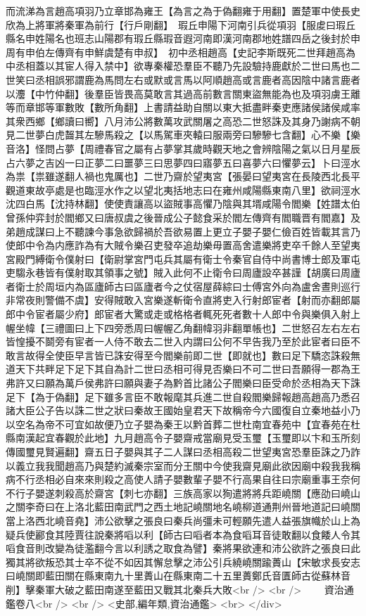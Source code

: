 而流涕為言趙高項羽乃立章邯為雍王【為言之為于偽翻雍于用翻】置楚軍中使長史欣為上將軍將秦軍為前行【行戶剛翻】　瑕丘申陽下河南引兵從項羽【服䖍曰瑕丘縣名申姓陽名也班志山陽郡有瑕丘縣瑕音遐河南即漢河南郡地姓譜四岳之後封於申周有申伯左傳齊有申鮮虞楚有申叔】　初中丞相趙高【史記李斯既死二世拜趙高為中丞相蓋以其宦人得入禁中】欲專秦權恐羣臣不聽乃先設驗持鹿獻於二世曰馬也二世笑曰丞相誤邪謂鹿為馬問左右或默或言馬以阿順趙高或言鹿者高因陰中諸言鹿者以灋【中竹仲翻】後羣臣皆畏高莫敢言其過高前數言關東盜無能為也及項羽虜王離等而章邯等軍數敗【數所角翻】上書請益助自關以東大抵盡畔秦吏應諸侯諸侯咸率其衆西鄉【鄉讀曰嚮】八月沛公將數萬攻武關屠之高恐二世怒誅及其身乃謝病不朝見二世夢白虎齧其左驂馬殺之【以馬駕車夾轅曰服兩旁曰驂驂七含翻】心不樂【樂音洛】怪問占夢【周禮春官之屬有占夢掌其歲時觀天地之會辨陰陽之氣以日月星辰占六夢之吉凶一曰正夢二曰噩夢三曰思夢四曰寤夢五曰喜夢六曰懼夢云】卜曰涇水為祟【祟雖遂翻人禍也鬼厲也】二世乃齋於望夷宮【張晏曰望夷宮在長陵西北長平觀道東故亭處是也臨涇水作之以望北夷括地志曰在雍州咸陽縣東南八里】欲祠涇水沈四白馬【沈持林翻】使使責讓高以盜賊事高懼乃陰與其壻咸陽令閻樂【姓譜太伯曾孫仲弈封於閻鄉又曰唐叔虞之後晉成公子懿食采於閻左傳齊有閻職晋有閻嘉】及弟趙成謀曰上不聽諫今事急欲歸禍於吾欲易置上更立子嬰子嬰仁儉百姓皆載其言乃使郎中令為内應詐為有大賊令樂召吏發卒追劫樂毋置高舍遣樂將吏卒千餘人至望夷宮殿門縛衛令僕射曰【衛尉掌宮門屯兵其屬有衛士令秦官自侍中尚書博士郎及軍屯吏騶永巷皆有僕射取其領事之號】賊入此何不止衛令曰周廬設卒甚謹【胡廣曰周廬者衛士於周垣内為區廬師古曰區廬者今之仗宿屋薛綜曰士傅宮外向為盧舍晝則巡行非常夜則警備不虞】安得賊敢入宮樂遂斬衛令直將吏入行射郎宦者【射而亦翻郎屬郎中令宦者屬少府】郎宦者大驚或走或格格者輒死死者數十人郎中令與樂俱入射上幄坐幃【三禮圖曰上下四旁悉周曰幄幄乙角翻幃羽非翻單帳也】二世怒召左右左右皆惶擾不鬬旁有宦者一人侍不敢去二世入内謂曰公何不早告我乃至於此宦者曰臣不敢言故得全使臣早言皆已誅安得至今閻樂前即二世【即就也】數曰足下驕恣誅殺無道天下共畔足下足下其自為計二世曰丞相可得見否樂曰不可二世曰吾願得一郡為王弗許又曰願為萬戶侯弗許曰願與妻子為黔首比諸公子閻樂曰臣受命於丞相為天下誅足下【為于偽翻】足下雖多言臣不敢報麾其兵進二世自殺閻樂歸報趙高趙高乃悉召諸大臣公子告以誅二世之狀曰秦故王國始皇君天下故稱帝今六國復自立秦地益小乃以空名為帝不可宜如故便乃立子嬰為秦王以黔首葬二世杜南宜春苑中【宜春苑在杜縣南漢起宜春觀於此地】九月趙高令子嬰齋戒當廟見受玉璽【玉璽即以卞和玉所刻傳國璽見賢遍翻】齋五日子嬰與其子二人謀曰丞相高殺二世望夷宮恐羣臣誅之乃詐以義立我我聞趙高乃與楚約滅秦宗室而分王關中今使我齋見廟此欲因廟中殺我我稱病不行丞相必自來來則殺之高使人請子嬰數輩子嬰不行高果自往曰宗廟重事王奈何不行子嬰遂刺殺高於齋宮【刺七亦翻】三族高家以狥遣將將兵距嶢關【應劭曰嶢山之關李奇曰在上洛北藍田南武門之西土地記嶢關地名嶢柳道通荆州晉地道記曰嶢關當上洛西北嶢音堯】沛公欲擊之張良曰秦兵尚彊未可輕願先遣人益張旗幟於山上為疑兵使酈食其陸賈往說秦將㗖以利【師古曰㗖者本為食㗖耳音徒敢翻以食餧人令其㗖食音則改變為徒濫翻今言以利誘之取食為譬】秦將果欲連和沛公欲許之張良曰此獨其將欲叛恐其士卒不從不如因其懈怠擊之沛公引兵繞嶢關踰蕢山【宋敏求長安志曰嶢關即藍田關在縣東南九十里蕢山在縣東南二十五里蕢鄭氏音匱師古從蘇林音削】擊秦軍大破之藍田南遂至藍田又戰其北秦兵大敗<br />
<br />
　　資治通鑑卷八<br />
<br />
<史部,編年類,資治通鑑>  <br>
   </div> 


